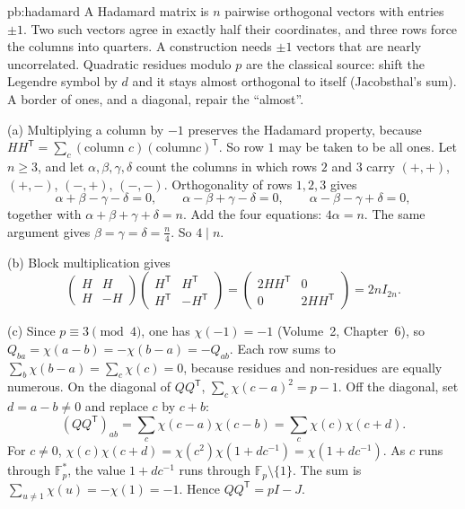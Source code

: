 \begin{solution}{pb:hadamard}
\idea A Hadamard matrix is $n$ pairwise orthogonal vectors with entries $\pm1$. Two such vectors agree
in exactly half their coordinates, and three rows force the columns into quarters. A construction needs $\pm1$
vectors that are nearly uncorrelated. Quadratic residues modulo $p$ are the classical source: shift the Legendre
symbol by $d$ and it stays almost orthogonal to itself (Jacobsthal's sum). A border of ones, and a diagonal, repair the ``almost''.

\writeup (a) Multiplying a column by $-1$ preserves the Hadamard property, because $HH^{\mathsf T}=\sum_c(\text{column }c)(\text{column
}c)^{\mathsf T}$. So row $1$ may be taken to be all ones. Let $n\ge3$, and let $\alpha,\beta,\gamma,\delta$ count the
columns in which rows $2$ and $3$ carry $(+,+)$, $(+,-)$, $(-,+)$, $(-,-)$. Orthogonality of rows $1,2,3$ gives
\[
\alpha+\beta-\gamma-\delta=0,\qquad\alpha-\beta+\gamma-\delta=0,\qquad\alpha-\beta-\gamma+\delta=0,
\]
together with $\alpha+\beta+\gamma+\delta=n$. Add the four equations: $4\alpha=n$. The same argument gives $\beta=\gamma=\delta=\frac n4$. So $4\mid n$.

(b) Block multiplication gives
\[
\begin{pmatrix}H&H\\H&-H\end{pmatrix}\begin{pmatrix}H^{\mathsf T}&H^{\mathsf T}\\H^{\mathsf T}&-H^{\mathsf T}\end{pmatrix}
=\begin{pmatrix}2HH^{\mathsf T}&0\\0&2HH^{\mathsf T}\end{pmatrix}=2nI_{2n}.
\]

(c) Since $p\equiv3\pmod4$, one has $\chi(-1)=-1$ (Volume~2, Chapter~6), so $Q_{ba}=\chi(a-b)=-\chi(b-a)=-Q_{ab}$. Each row sums to
$\sum_b\chi(b-a)=\sum_c\chi(c)=0$, because residues and non-residues are equally numerous. On the diagonal of $QQ^{\mathsf T}$,
$\sum_c\chi(c-a)^2=p-1$. Off the diagonal, set $d=a-b\ne0$ and replace $c$ by $c+b$:
\[
(QQ^{\mathsf T})_{ab}=\sum_c\chi(c-a)\chi(c-b)=\sum_c\chi(c)\chi(c+d).
\]
For $c\ne0$, $\chi(c)\chi(c+d)=\chi(c^2)\chi(1+dc^{-1})=\chi(1+dc^{-1})$. As $c$ runs through $\mathbb F_p^*$, the value $1+dc^{-1}$
runs through $\mathbb F_p\setminus\{1\}$. The sum is $\sum_{u\ne1}\chi(u)=-\chi(1)=-1$. Hence $QQ^{\mathsf T}=pI-J$.


\end{solution}
